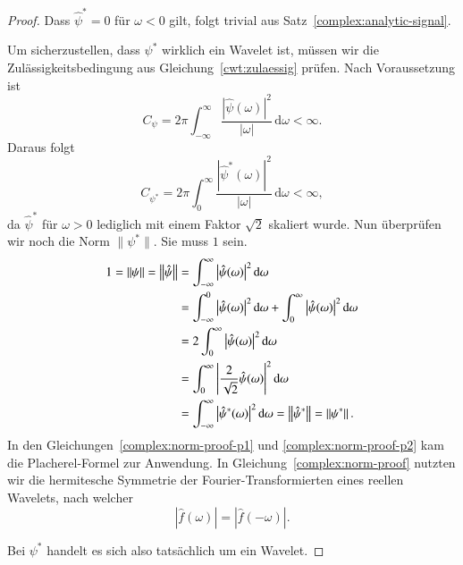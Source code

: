 \begin{proof}
	Dass $\hat\psi^\ast = 0$ für $\omega < 0$ gilt, folgt trivial aus Satz~\ref{complex:analytic-signal}.

	Um sicherzustellen, dass $\psi^\ast$ wirklich ein Wavelet ist, müssen wir die Zulässigkeitsbedingung aus Gleichung~\eqref{cwt:zulaessig} prüfen.
	Nach Voraussetzung ist 
	\[
	C_{\psi}
	=
	2\pi
	\int_{-\infty}^\infty \frac{|\hat{\psi}(\omega)|^2}{|\omega|}\,\mathrm{d}\omega < \infty.
	\]
	Daraus folgt
	\[
	C_{\psi^\ast}
	=
	2\pi
	\int_{0}^\infty \frac{|\hat{\psi}^\ast(\omega)|^2}{|\omega|}\,\mathrm{d}\omega < \infty,
	\]
	da $\hat\psi^\ast$ für $\omega > 0$ lediglich mit einem Faktor $\sqrt 2$ skaliert wurde.
	Nun überprüfen wir noch die Norm $\|\psi^\ast\|$. 
	Sie muss $1$ sein.
	\begin{align}
		1 = \left\|\psi\right\| = \left\|\hat{\psi}\right\| 
		&= \int_{-\infty}^{\infty}\left|\hat{\psi}(\omega)\right|^2 \mathrm{d}\omega \label{complex:norm-proof-p1}\\
		&= \int_{-\infty}^{0}\left|\hat{\psi}(\omega)\right|^2 \mathrm{d}\omega +  \int_{0}^{\infty}\left|\hat{\psi}(\omega)\right|^2 \mathrm{d}\omega \notag\\
		&=  2\int_{0}^{\infty}\left|\hat{\psi}(\omega)\right|^2 \mathrm{d}\omega \label{complex:norm-proof}\\
		&=  \int_{0}^{\infty}\left|\frac{2}{\sqrt{2}}\hat{\psi}(\omega)\right|^2 \mathrm{d}\omega \notag\\
		&=  \int_{-\infty}^{\infty}\left|\hat{\psi}^\ast(\omega)\right|^2 \mathrm{d}\omega 
		= \left\|\hat{\psi}^\ast\right\| = \left\|\psi^\ast\right\|.\label{complex:norm-proof-p2}
	\end{align}
	In den Gleichungen~\eqref{complex:norm-proof-p1} und \eqref{complex:norm-proof-p2} kam die Placherel-Formel zur Anwendung.
	In Gleichung~\eqref{complex:norm-proof} nutzten wir die hermitesche Symmetrie der Fourier-Transformierten eines reellen Wavelets, nach welcher
	\[\left|\hat{f}(\omega)\right| = \left|\hat{f}(-\omega)\right|.\]


	Bei $\psi^\ast$ handelt es sich also tatsächlich um ein Wavelet.
\end{proof}
